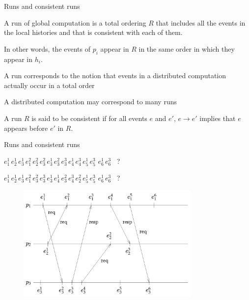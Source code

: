 \begin{frame}{Runs and consistent runs}
	
\begin{definition}[Run]
A \alert{run} of global computation is a total ordering $R$ that includes all the events
in the local histories and that is consistent with each of them.

\medskip
\BI
\item In other words, the events of $p_i$ appear in $R$ in the same order in which they appear in
$h_i$.
\item A run corresponds to the notion that events in a distributed computation
  actually occur in a total order
\item A distributed computation may correspond to many runs
\EI
\end{definition}

\begin{definition}
A run $R$ is said to be \alert{consistent} if for all events $e$ and $e'$,
$e \rightarrow e'$ implies that $e$ appears before $e'$ in $R$.
\end{definition}
\end{frame}


\begin{frame}{Runs and consistent runs}

\BI
\item $e_1^1\,e_2^1\,e_3^1\,e_1^2\,e_2^2\,e_3^2\,e_3^1\,e_3^2\,e_3^3\,e_4^1\,e_4^3\,e_5^1\,e_5^3\,\,e_6^1\,e_6^3$ \ ?
\item $e_1^1\,e_2^1\,e_3^1\,e_1^2\,e_3^2\,e_3^3\,e_3^1\,e_4^1\,e_3^2\,e_4^3\,e_2^2\,e_5^1\,e_5^3\,\,e_6^1\,e_6^3$ \ ?
\EI

\begin{figure}
\includegraphics[width=9cm]{figs/02/figure-1}
\end{figure}

\end{frame}

